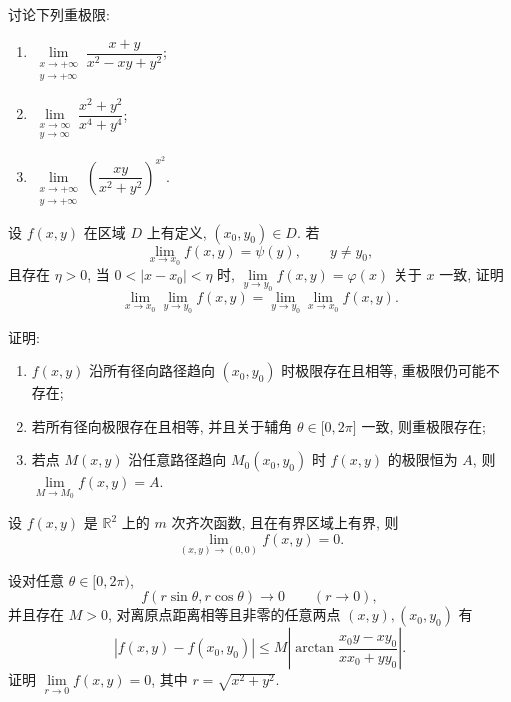 \documentclass[../../数学分析培优讲义.tex]{subfiles}
\begin{document}
\begin{example}
讨论下列重极限:
\begin{enumerate}[label=(\arabic*)]
    \item $\displaystyle\lim\limits_{\substack{x\to+\infty\\y\to+\infty}}\dfrac{x+y}{x^2-xy+y^2}$;
    \item $\displaystyle\lim\limits_{\substack{x\to\infty\\y\to\infty}}\dfrac{x^2+y^2}{x^4+y^4}$;
    \item $\displaystyle\lim\limits_{\substack{x\to+\infty\\y\to+\infty}}\left(\dfrac{xy}{x^2+y^2}\right)^{x^2}$.
\end{enumerate}
\end{example}
\exampleblank

\begin{example}
设 $f(x,y)$ 在区域 $D$ 上有定义, $(x_0,y_0)\in D$. 若
\[
    \lim\limits_{x\to x_0}f(x,y)=\psi(y),\qquad y\ne y_0,
\]
且存在 $\eta>0$, 当 $0<|x-x_0|<\eta$ 时, $\displaystyle\lim\limits_{y\to y_0}f(x,y)=\varphi(x)$ 关于 $x$ 一致, 证明
\[
    \lim\limits_{x\to x_0}\lim\limits_{y\to y_0}f(x,y)
    =\lim\limits_{y\to y_0}\lim\limits_{x\to x_0}f(x,y).
\]
\end{example}
\exampleblank

\begin{example}[\markstar]
证明:
\begin{enumerate}[label=(\arabic*)]
    \item $f(x,y)$ 沿所有径向路径趋向 $(x_0,y_0)$ 时极限存在且相等, 重极限仍可能不存在;
    \item 若所有径向极限存在且相等, 并且关于辅角 $\theta\in\lbrack0,2\pi\rbrack$ 一致, 则重极限存在;
    \item 若点 $M(x,y)$ 沿任意路径趋向 $M_0(x_0,y_0)$ 时 $f(x,y)$ 的极限恒为 $A$, 则 $\displaystyle\lim\limits_{M\to M_0}f(x,y)=A$.
\end{enumerate}
\end{example}
\exampleblank

\begin{example}
设 $f(x,y)$ 是 $\mathbb{R}^2$ 上的 $m$ 次齐次函数, 且在有界区域上有界, 则
\[
    \lim\limits_{(x,y)\to(0,0)}f(x,y)=0.
\]
\end{example}
\exampleblank

\begin{example}
设对任意 $\theta\in\lbrack0,2\pi)$,
\[
    f(r\sin\theta,r\cos\theta)\to0\qquad(r\to0),
\]
并且存在 $M>0$, 对离原点距离相等且非零的任意两点 $(x,y),(x_0,y_0)$ 有
\[
    |f(x,y)-f(x_0,y_0)|
    \leq M\left|\arctan\dfrac{x_0y-xy_0}{xx_0+yy_0}\right|.
\]
证明 $\displaystyle\lim\limits_{r\to0}f(x,y)=0$, 其中 $r=\sqrt{x^2+y^2}$.
\end{example}
\exampleblank
\end{document}
